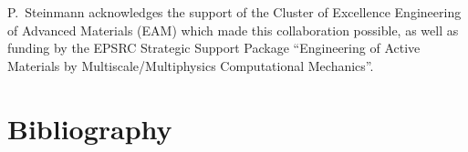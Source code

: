 \documentclass[times,doublespace]{nmeauth}
\begin{document}
P.~Steinmann acknowledges the support of the Cluster of Excellence Engineering of Advanced Materials (EAM) which made this collaboration possible, as well as funding by the EPSRC Strategic Support Package ``Engineering of Active Materials by Multiscale/Multiphysics Computational Mechanics''.

\ifijnme

\else
\section*{Bibliography}

\fi


%
\end{document}
